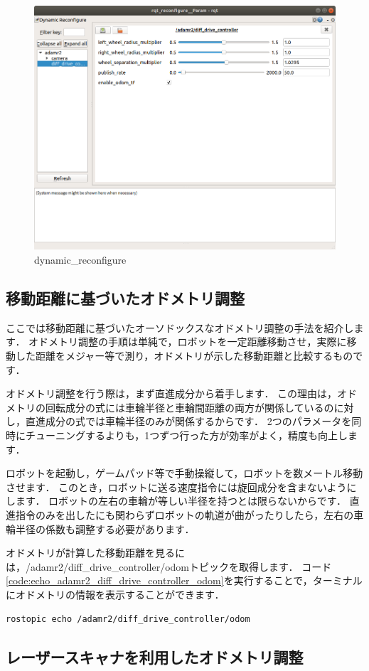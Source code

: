 \documentclass[{../../master}]{subfiles}
\begin{document}
\begin{figure}[ht]
  \centering
  \includegraphics[height=100truemm]{images/dynamic_reconfigure.png}
  \caption{\textsf{dynamic\_reconfigure}}
  \label{fig:dynamic_reconfigure}
\end{figure}

\subsection{移動距離に基づいたオドメトリ調整}

ここでは移動距離に基づいたオーソドックスなオドメトリ調整の手法を紹介します．
オドメトリ調整の手順は単純で，ロボットを一定距離移動させ，実際に移動した距離をメジャー等で測り，オドメトリが示した移動距離と比較するものです．

オドメトリ調整を行う際は，まず直進成分から着手します．
この理由は，オドメトリの回転成分の式には車輪半径と車輪間距離の両方が関係しているのに対し，直進成分の式では車輪半径のみが関係するからです．
2つのパラメータを同時にチューニングするよりも，1つずつ行った方が効率がよく，精度も向上します．

ロボットを起動し，ゲームパッド等で手動操縦して，ロボットを数メートル移動させます．
このとき，ロボットに送る速度指令には旋回成分を含まないようにします．
ロボットの左右の車輪が等しい半径を持つとは限らないからです．
直進指令のみを出したにも関わらずロボットの軌道が曲がったりしたら，左右の車輪半径の係数も調整する必要があります．

オドメトリが計算した移動距離を見るには，\textsf{/adamr2/diff\_drive\_controller/odom}トピックを取得します．
コード\ref{code:echo_adamr2_diff_drive_controller_odom}を実行することで，ターミナルにオドメトリの情報を表示することができます．

\begin{lstlisting}[language=sh, label=code:echo_adamr2_diff_drive_controller_odom, caption=Show Odometry Topic Message]
rostopic echo /adamr2/diff_drive_controller/odom
\end{lstlisting}

\subsection{レーザースキャナを利用したオドメトリ調整}
\end{document}
